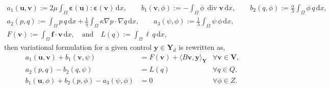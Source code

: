 \documentclass[smallextended]{svjour3}
\numberwithin{equation}{section}
\numberwithin{figure}{section}
\numberwithin{table}{section}
\newcommand\bV{\mathbf{V}}
\newcommand\ff{\boldsymbol{f}}
\newcommand\bg{\boldsymbol{g}}
\newcommand\beps{\boldsymbol{\varepsilon}}
\newcommand\buu{\underline{\boldsymbol{u}}}
\newcommand\by{\boldsymbol{y}}
\newcommand\bu{\boldsymbol{u}}
\newcommand\bv{\boldsymbol{v}}
\newcommand{\bYd}{\boldsymbol{Y}_d}
\newcommand{\bY}{\boldsymbol{Y}}
\newcommand{\bbV}{\mathbb{V}}
\newcommand\vdiv{{\mathop{\mathrm{div}}\nolimits}}
\newcommand{\dx}{\,\mathrm{d}x}
\newcommand{\ds}{\,\mathrm{d}s}
\begin{document}
	\begin{gather*}
		a_1(\bu, \bv):=2 \mu \int_{\Omega} \beps(\bu):\beps(\bv) \dx, \qquad 
		b_1(\bv, \phi):= - \int_{\Omega} \phi\, \vdiv \bv \dx, \qquad  b_2(q, \phi):= \frac{\alpha}{{\lambda}} \int_{\Omega} \phi \, q \dx, \\
		a_2(p, q):= \int_{\Omega} p \,q \dx + \frac{1}{\eta} \int_{\Omega} \kappa \nabla p \cdot \nabla q \dx, \qquad a_3(\psi, \phi):=  \frac{1}{{\lambda}} \int_{\Omega} \psi \,\phi \dx, \\
		F(\bv):= \int_{\Omega} \ff \cdot  \bv \dx,
        \quad \text{and} \quad L(q):= \int_{\Omega} \ell \, q \dx,
	\end{gather*}
	then variational formulation for a given control $\by \in \bYd$ is rewritten as,
	\begin{subequations} \label{eq:weak-control-state}
		\begin{align}
		a_1(\bu, \bv) + b_1(\bv, \psi) &= F(\bv)+         \langle B \bv, \by \rangle_{\bY }        & \forall \bv \in \bV, \\
		a_2(p, q) - b_2(q, \psi) & = L(q) & \forall q \in Q, \\
		b_1(\bu, \phi) + b_2(p, \phi) - a_3(\psi, \phi) & = 0  & \forall \phi \in Z.
		\end{align}
	\end{subequations}
%	
	
	
	
\end{document}
